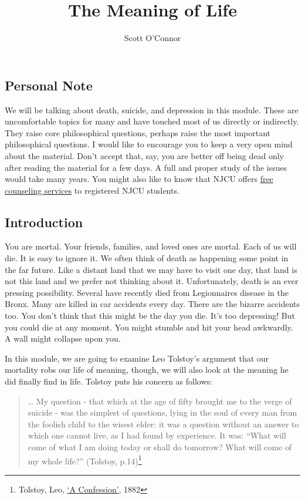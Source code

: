 \documentclass[9pt]{article}
\title{The Meaning of Life}
\author{Scott O’Connor}
\begin{document}
\maketitle

\subsection{Personal Note}\label{personal-note}

We will be talking about death, suicide, and depression in this module.
These are uncomfortable topics for many and have touched most of us
directly or indirectly. They raise core philosophical questions, perhaps
raise the most important philosophical questions. I would like to
encourage you to keep a very open mind about the material. Don't accept
that, say, you are better off being dead only after reading the material
for a few days. A full and proper study of the issues would take many
years. You might also like to know that NJCU offers
\href{http://www.njcu.edu/counselingcenter}{free counseling services} to
registered NJCU students.

\subsection{Introduction}\label{introduction}

You are mortal. Your friends, families, and loved ones are mortal. Each
of us will die. It is easy to ignore it. We often think of death as
happening some point in the far future. Like a distant land that we may
have to visit one day, that land is not this land and we prefer not
thinking about it. Unfortunately, death is an ever pressing possibility.
Several have recently died from Legionnaires disease in the Bronx. Many
are killed in car accidents every day. There are the bizarre accidents
too. You don't think that this might be the day you die. It's too
depressing! But you could die at any moment. You might stumble and hit
your head awkwardly. A wall might collapse upon you.

In this module, we are going to examine Leo Tolstoy's argument that our
mortality robs our life of meaning, though, we will also look at the
meaning he did finally find in life. Tolstoy puts his concern as
follows:

\begin{quote}
\ldots{} My question - that which at the age of fifty brought me to the
verge of suicide - was the simplest of questions, lying in the soul of
every man from the foolish child to the wisest elder: it was a question
without an answer to which one cannot live, as I had found by
experience. It was: ``What will come of what I am doing today or shall
do tomorrow? What will come of my whole life?'' (Tolstoy, p.14)\footnote{Tolstoy, Leo, \href{/Teaching/Examined/Meaning/Tolstoy.pdf}{`A
  Confession'}, 1882}
\end{quote}
\end{document}
